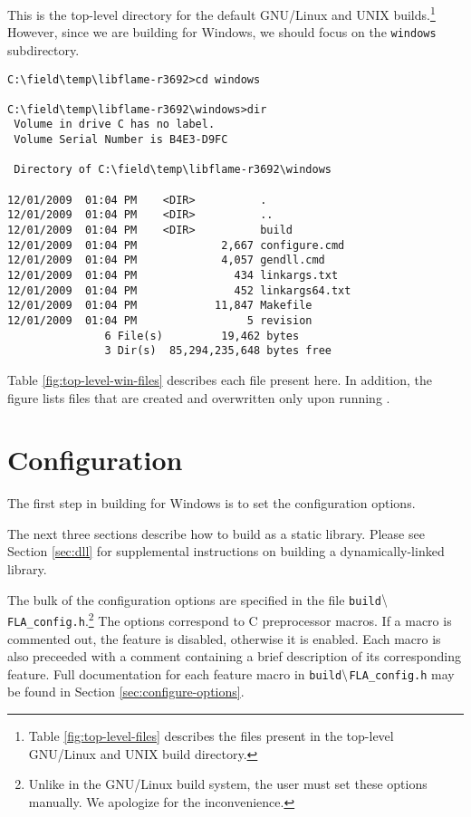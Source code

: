 \noindent
This is the top-level directory for the default GNU/Linux and UNIX
builds.\footnote{Table \ref{fig:top-level-files} describes the files present
in the top-level GNU/Linux and UNIX build directory.}
However, since we are building \libflame for Windows, we should focus on the
{\tt windows} subdirectory.

\begin{Verbatim}[frame=single,framesep=2.5mm,xleftmargin=5mm,fontsize=\footnotesize]
C:\field\temp\libflame-r3692>cd windows

C:\field\temp\libflame-r3692\windows>dir
 Volume in drive C has no label.
 Volume Serial Number is B4E3-D9FC

 Directory of C:\field\temp\libflame-r3692\windows

12/01/2009  01:04 PM    <DIR>          .
12/01/2009  01:04 PM    <DIR>          ..
12/01/2009  01:04 PM    <DIR>          build
12/01/2009  01:04 PM             2,667 configure.cmd
12/01/2009  01:04 PM             4,057 gendll.cmd
12/01/2009  01:04 PM               434 linkargs.txt
12/01/2009  01:04 PM               452 linkargs64.txt
12/01/2009  01:04 PM            11,847 Makefile
12/01/2009  01:04 PM                 5 revision
               6 File(s)         19,462 bytes
               3 Dir(s)  85,294,235,648 bytes free
\end{Verbatim}

\noindent
Table \ref{fig:top-level-win-files} describes each file present here.
In addition, the figure lists files that are created and overwritten
only upon running \configurecmdns.



\section{Configuration}
\label{sec:configuration-win}


The first step in building \libflame for Windows is to set the configuration
options.

The next three sections describe how to build \libflame as a static
library.
Please see Section \ref{sec:dll} for supplemental instructions on building a
dynamically-linked library.

The bulk of the configuration options are specified in the file
{\tt build$\backslash$FLA\_config.h}.\footnote{Unlike in the GNU/Linux build system,
the user must set these options manually. We apologize for the inconvenience.}
The options correspond to C preprocessor macros.
If a macro is commented out, the feature is disabled, otherwise it is enabled.
Each macro is also preceeded with a comment containing a brief description of
its corresponding feature.
Full documentation for each feature macro in {\tt build$\backslash$FLA\_config.h}
may be found in Section \ref{sec:configure-options}.

